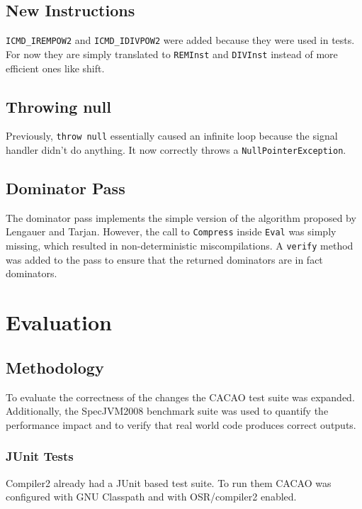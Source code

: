 \documentclass[draft,final]{vutinfth} %
\begin{document}
    \section{New Instructions}

    \lstinline{ICMD_IREMPOW2} and \lstinline{ICMD_IDIVPOW2} were added because they were used in tests.
    For now they are simply translated to \lstinline{REMInst} and \lstinline{DIVInst} instead of more efficient ones like shift.


    \section{Throwing null}

    Previously, \lstinline{throw null} essentially caused an infinite loop because the signal handler didn't do anything. It now correctly throws a \lstinline{NullPointerException}.


    \section{Dominator Pass}

    The dominator pass implements the simple version of the algorithm\cite{dominators} proposed by
    Lengauer and Tarjan.
    However, the call to \lstinline{Compress} inside \lstinline{Eval} was simply missing,
    which resulted in non-deterministic miscompilations.
    A \lstinline{verify} method was added to the pass to ensure that the returned dominators are in fact dominators.

    \chapter{Evaluation}


    \section{Methodology}

    To evaluate the correctness of the changes the CACAO test suite was expanded.
    Additionally, the SpecJVM2008 benchmark suite was used to quantify the performance impact and to verify that real
    world code produces correct outputs.

    \subsection{JUnit Tests}

    Compiler2 already had a JUnit based test suite.
    To run them CACAO was configured with GNU Classpath and with OSR/compiler2 enabled.
\end{document}
